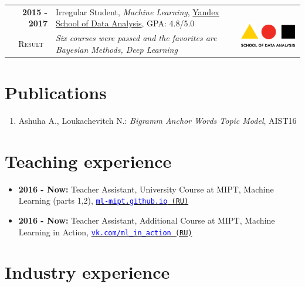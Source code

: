 \documentclass[a4paper,10pt]{article} %
\begin{document}
\begin{tabular}{rp{14cm}c}	
\textbf{2015 -  2017} & Irregular Student, \emph{Machine Learning}, \href{https://yandexdataschool.com/}{Yandex School of Data Analysis}, GPA: 4.8/5.0& \multirow{2}{*}{~~\includegraphics[scale=0.25]{img/shad}}\\
\textsc{Result}~& \emph{Six courses were passed and the favorites are Bayesian Methods, Deep Learning}
\end{tabular}

\section{Publications}
\begin{enumerate}
	\item Ashuha A., Loukachevitch N.: \emph{Bigramm Anchor Words Topic Model}, AIST16

\end{enumerate}

\section{Teaching experience}
\begin{itemize}
	\item \textbf{2016 - Now:} Teacher Assistant, University Course at MIPT, Machine Learning (parts 1,2), \href{https://ml-mipt.github.io/}{\texttt{\textcolor{blue}{ml-mipt.github.io} (RU)}}
	\item \textbf{2016 - Now:} Teacher Assistant, Additional Course at MIPT, Machine Learning in Action, \href{https://vk.com/data_mining_in_action}{\texttt{\textcolor{blue}{vk.com/ml\_in\_action} (RU)}}
\end{itemize}

\section{Industry experience}
\end{document}
